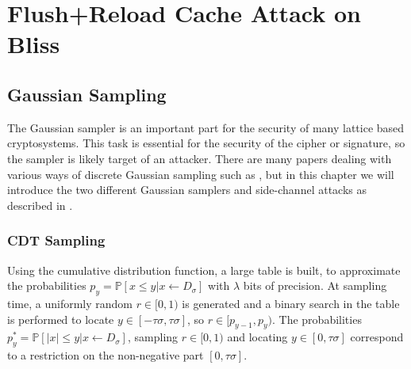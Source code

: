 \chapter{Flush+Reload Cache Attack on Bliss}
\label{bliss}

\section{Gaussian Sampling}
The Gaussian sampler is an important part for the security of many lattice based cryptosystems. This task is essential for the security of the cipher or signature, so the sampler is likely target of an attacker. There are many papers dealing with various ways of discrete Gaussian sampling such as \cite{cryptoeprint:2010:088}, but in this chapter we will introduce the two different Gaussian samplers and side-channel attacks as described in \cite{cryptoeprint:2016:300}.
\subsection{\acs{CDT} Sampling}
Using the cumulative distribution function, a large table is built, to approximate the probabilities $p_y=\mathbb{P}[x \le y| x \leftarrow D_\sigma ]$ with $\lambda$ bits of precision. At sampling time, a uniformly random $r \in [0,1)$ is generated and a binary search in the table is performed to locate $y \in [-\tau\sigma, \tau\sigma]$, so $r \in [p_{y-1}, p_y)$. The probabilities $p^*_y = \mathbb{P}[|x| \le y| x \leftarrow D_\sigma]$, sampling $r \in [0,1)$ and locating $y \in [0, \tau \sigma]$ correspond to a restriction on the non-negative part $[0, \tau\sigma]$.

